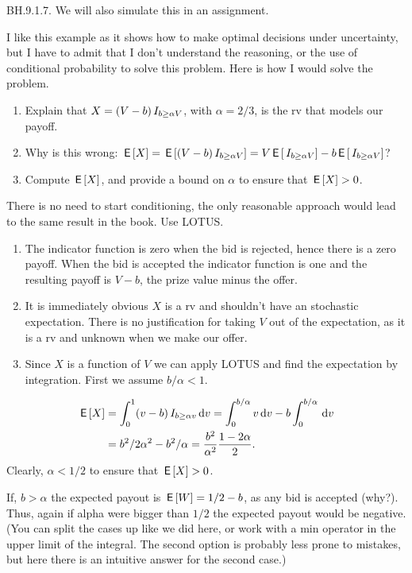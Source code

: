 \begin{exercise}
BH.9.1.7. We will also simulate this in an assignment.

I  like this example as it  shows how to make optimal decisions under uncertainty, but I have to admit that I don't understand the reasoning, or the use of conditional probability to solve this problem. Here is how I would solve the problem.
\begin{enumerate}
\item Explain that $X=(V-b)\,I_{b \geq \alpha V}$, with $\alpha=2/3$, is the rv that models our payoff.
\item Why is this wrong: $\,\mathsf{E}\left[X\right] = \,\mathsf{E}\left[(V-b)\,I_{b \geq \alpha V}\right] = V \,\mathsf{E}\left[\,I_{b \geq \alpha V}\right] -b \,\mathsf{E}\left[\,I_{b \geq \alpha V}\right]$?
\item Compute $\,\mathsf{E}\left[X\right]$, and provide a bound on $\alpha$ to ensure that $\,\mathsf{E}\left[X\right] > 0$.
\end{enumerate}
\begin{hint}
  There is no need to start conditioning, the only reasonable approach would lead to the same result in the book. Use LOTUS.
\end{hint}

\begin{solution}
\begin{enumerate}
  \item The indicator function is zero when the bid is rejected, hence there is a zero payoff. When the bid is accepted the indicator function is one and the resulting payoff is $V-b$, the prize value minus the offer.
  \item It is immediately obvious $X$ is a rv and shouldn't have an stochastic expectation. There is no justification for taking $V$ out of the expectation, as it is a rv and unknown when we make our offer.
  \item Since $X$ is a function of $V$ we can apply LOTUS and find the expectation by integration. First we assume $b/\alpha < 1$.
\end{enumerate}
\begin{align*}
\,\mathsf{E}\left[X\right] &= \int_0^1 (v-b) \,I_{b\geq \alpha v} \,\textrm{d}v = \int_0^{b/\alpha} v \,\textrm{d}v - b \int_0^{b/\alpha}  \,\textrm{d}v \\
  &= b^2/2\alpha^2 - b^2/\alpha = \frac{b^{2}}{\alpha^{2}} \frac{1-2\alpha}{2}.
\end{align*}
Clearly, $\alpha<1/2$ to ensure that $\,\mathsf{E}\left[X\right] > 0$.

If, $b>\alpha$ the expected payout is $\,\mathsf{E}\left[W\right] = 1/2 -b $, as any bid is accepted (why?). Thus, again if alpha were bigger than $1/2$ the expected payout would be negative.
(You can split the cases up like we did here, or work with a min operator in the upper limit of the integral. The second option is probably less prone to mistakes, but here there is an intuitive answer for the second case.)
\end{solution}
\end{exercise}

